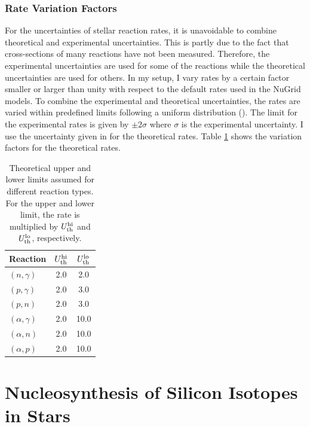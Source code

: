\documentclass{brandeis-thesis3.2}
\begin{document}
\subsection{Rate Variation Factors}
For the uncertainties of stellar reaction rates, it is unavoidable to combine theoretical and experimental uncertainties. This is partly due to the fact that cross-sections of many reactions have not been measured. Therefore, the experimental uncertainties are used for some of the reactions while the theoretical uncertainties are used for others. In my setup, I vary rates by a certain factor smaller or larger than unity with respect to the default rates used in the NuGrid models. To combine the experimental and theoretical uncertainties, the rates are varied within predefined limits following a uniform distribution (\citealt{Rauscher_2016}). The limit for the experimental rates is given by $\pm 2\sigma$ where $\sigma$ is the experimental uncertainty. I use the uncertainty given in \cite{Rauscher_2016} for the theoretical rates. Table \ref{tab:rate} shows the variation factors for the theoretical rates.

\begin{table}[H]
    \centering
    \caption{Theoretical upper and lower limits assumed for different reaction types. For the upper and lower limit, the rate is multiplied by $U^{\rm hi}_{\rm th}$ and $U^{\rm lo}_{\rm th}$, respectively.}
\begin{tabular}{l c c}
        \hline
          Reaction &    $U^{\rm hi}_{\rm th}$ & $U^{\rm lo}_{\rm th}$\\
        \hline
        $(n,\gamma)$   & 2.0 & 2.0\\
        $(p,\gamma)$   & 2.0 & 3.0\\
        $(p,n)$         & 2.0 & 3.0\\
        $(\alpha,\gamma)$ & 2.0 & 10.0\\
        $(\alpha, n)$ & 2.0 & 10.0\\
        $(\alpha, p)$ & 2.0 & 10.0\\
        \hline
    \end{tabular}
    \label{tab:rate}
\end{table}



\chapter{Nucleosynthesis of Silicon Isotopes in Stars} \label{pre-result}
\end{document}
